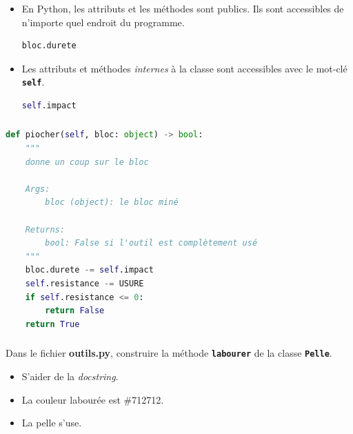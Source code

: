 \documentclass[svgnames,11pt]{beamer}
\begin{document}
\begin{frame}[fragile]
    \frametitle{}

    \begin{itemize}
        \item<1-> En Python, les attributs et les méthodes sont publics. Ils sont accessibles de n'importe quel endroit du programme.
        \begin{center}
        \begin{lstlisting}[language=Python , basicstyle=\small, xleftmargin=2em, xrightmargin=2em]
bloc.durete
\end{lstlisting}
        \end{center}
        \item<2->Les attributs et méthodes \emph{internes} à la classe sont accessibles avec le mot-clé \textbf{\texttt{self}}.
        \begin{center}
        \begin{lstlisting}[language=Python , basicstyle=\small, xleftmargin=2em, xrightmargin=2em]
self.impact
\end{lstlisting}
        \end{center}
    \end{itemize}

\end{frame}
\begin{frame}[fragile]
    \frametitle{}

    \begin{center}
    \begin{lstlisting}[language=Python , basicstyle=\small, xleftmargin=2em, xrightmargin=2em]
def piocher(self, bloc: object) -> bool:
    """
    donne un coup sur le bloc

    Args:
        bloc (object): le bloc miné

    Returns:
        bool: False si l'outil est complètement usé
    """
    bloc.durete -= self.impact
    self.resistance -= USURE
    if self.resistance <= 0:
        return False
    return True
\end{lstlisting}
    \label{CODE}
    \end{center}

\end{frame}
\begin{frame}
    \frametitle{}

    \begin{activite}
    Dans le fichier \textbf{outils.py}, construire la méthode \textbf{\texttt{labourer}} de la classe \textbf{\texttt{Pelle}}.
    \begin{itemize}
        \item S'aider de la \emph{docstring}.
        \item La couleur labourée est \#712712.
        \item La pelle s'use.
    \end{itemize}
    \end{activite}

\end{frame}
\end{document}
